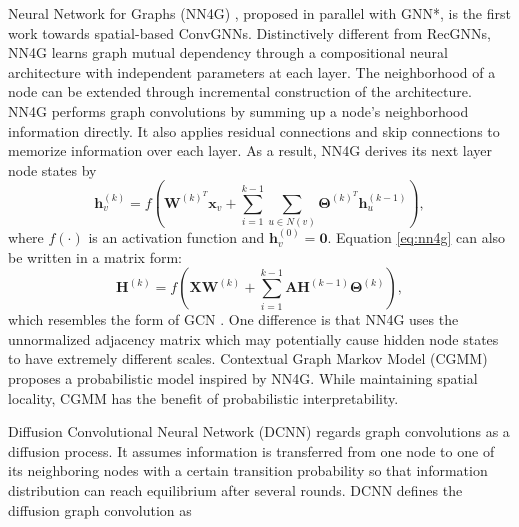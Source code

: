     Neural Network for Graphs (NN4G) \cite{micheli2009neural}, proposed in parallel with GNN*, is the first work towards spatial-based ConvGNNs. Distinctively different from RecGNNs, NN4G learns graph mutual dependency through a compositional neural architecture with independent parameters at each layer. The neighborhood of a node can be extended through incremental construction of the architecture.
    NN4G performs graph convolutions by summing up a node's neighborhood information directly. It also applies residual connections and skip connections to memorize information over each layer. As a result, NN4G derives its next layer node states by
    \begin{equation}
        \mathbf{h}_v^{(k)} = f(\mathbf{W}^{(k)^T}\mathbf{x}_v+\sum_{i=1}^{k-1}\sum_{u\in N(v)}\mathbf{\Theta}^{(k)^T}\mathbf{h}_u^{(k-1)}),
        \label{eq:nn4g}
    \end{equation}
    where $f(\cdot)$ is an activation function and $\mathbf{h}_v^{(0)}=\mathbf{0}$.  Equation \ref{eq:nn4g} can also be written in a matrix form:
    \begin{equation}
        \mathbf{H}^{(k)} = f(\mathbf{X}\mathbf{W}^{(k)}+\sum_{i=1}^{k-1}\mathbf{A}\mathbf{H}^{(k-1)}\mathbf{\Theta}^{(k)}),
    \end{equation}
    which resembles the form of GCN \cite{kipf2017semi}. One difference is that NN4G uses the unnormalized adjacency matrix which may potentially cause hidden node states to have extremely different scales.
    Contextual Graph Markov Model (CGMM) \cite{bacciu2018contextual} proposes a probabilistic model inspired by NN4G. While maintaining spatial locality, CGMM has the benefit of probabilistic interpretability.
    
    
    Diffusion Convolutional Neural Network (DCNN) \cite{atwood2016diffusion} regards graph convolutions as a diffusion process. It assumes information is transferred from one node to one of its neighboring nodes with a certain transition probability so that information distribution can reach equilibrium after several rounds. DCNN defines the diffusion graph convolution as
    
